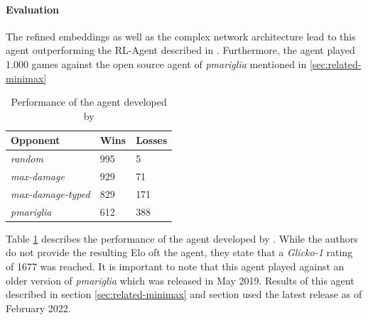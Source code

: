 \paragraph{Evaluation}
The refined embeddings as well as the complex network architecture lead to this agent outperforming
the RL-Agent described in \cite{GottaTrainEmAll}. Furthermore, the agent played 1.000 games against
the open source agent of \textit{pmariglia} mentioned in \ref{sec:related-minimax}
\begin{table}[h]
    \centering
        \begin{tabular}{|l|l|l|}
            \hline
            \textbf{Opponent} & \textbf{Wins} & \textbf{Losses} \\
            \hline
            \emph{random} & 995 & 5 \\
            \hline
            \emph{max-damage} & 929 & 71 \\
            \hline
            \emph{max-damage-typed} & 829 & 171 \\
            \hline
            \emph{pmariglia} & 612 & 388 \\
            \hline
        \end{tabular}
        \caption{Performance of the agent developed by \cite{Huang_Lee_2019}}
        \label{tbl:State-Of-The-Art-Results}
\end{table} 
Table \ref{tbl:State-Of-The-Art-Results} describes the performance of the agent developed by
\cite{Huang_Lee_2019}.
While the authors do not provide the resulting Elo oft the agent, they state that a 
\textit{Glicko-1} rating of 1677 was reached. It is important to note that this agent played
against an older version of \textit{pmariglia} which was released in May 2019. Results
of this agent described in section \ref{sec:related-minimax} and section  
used the latest release as of February 2022.

